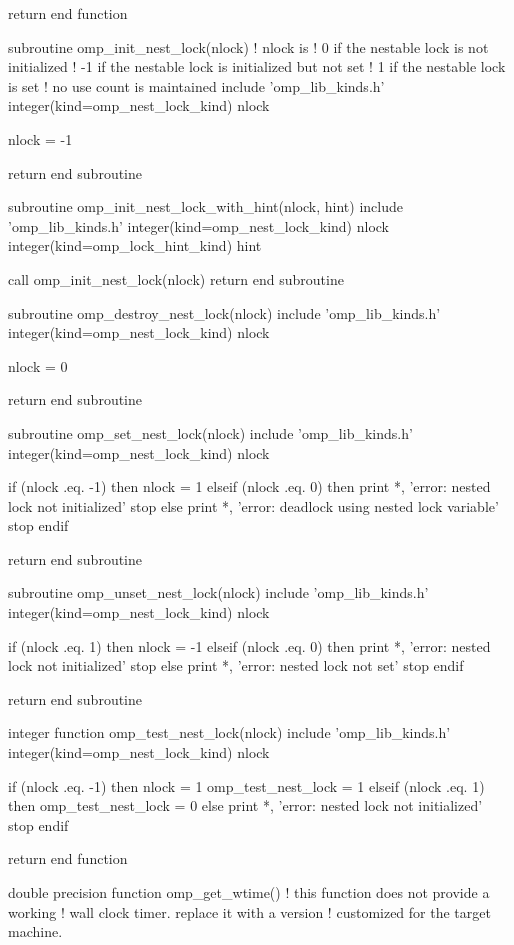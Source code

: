 {\begin{ompfFunction}
  return
end function

subroutine omp_init_nest_lock(nlock)
  ! nlock is
  ! 0 if the nestable lock is not initialized
  ! -1 if the nestable lock is initialized but not set
  ! 1 if the nestable lock is set
  ! no use count is maintained
  include 'omp_lib_kinds.h'
  integer(kind=omp_nest_lock_kind) nlock

  nlock = -1

  return
end subroutine

subroutine omp_init_nest_lock_with_hint(nlock, hint)
  include 'omp_lib_kinds.h'
  integer(kind=omp_nest_lock_kind) nlock
  integer(kind=omp_lock_hint_kind) hint

  call omp_init_nest_lock(nlock)
  return
end subroutine

subroutine omp_destroy_nest_lock(nlock)
  include 'omp_lib_kinds.h'
  integer(kind=omp_nest_lock_kind) nlock

  nlock = 0

  return
end subroutine

subroutine omp_set_nest_lock(nlock)
  include 'omp_lib_kinds.h'
  integer(kind=omp_nest_lock_kind) nlock

  if (nlock .eq. -1) then
    nlock = 1
  elseif (nlock .eq. 0) then
    print *, 'error: nested lock not initialized'
    stop
  else
    print *, 'error: deadlock using nested lock variable'
    stop
  endif

  return
end subroutine

subroutine omp_unset_nest_lock(nlock)
  include 'omp_lib_kinds.h'
  integer(kind=omp_nest_lock_kind) nlock

  if (nlock .eq. 1) then
    nlock = -1
  elseif (nlock .eq. 0) then
    print *, 'error: nested lock not initialized'
    stop
  else
    print *, 'error: nested lock not set'
    stop
  endif

  return
end subroutine

integer function omp_test_nest_lock(nlock)
  include 'omp_lib_kinds.h'
  integer(kind=omp_nest_lock_kind) nlock

  if (nlock .eq. -1) then
    nlock = 1
    omp_test_nest_lock = 1
  elseif (nlock .eq. 1) then
    omp_test_nest_lock = 0
  else
    print *, 'error: nested lock not initialized'
    stop
  endif

  return
end function

double precision function omp_get_wtime()
  ! this function does not provide a working
  ! wall clock timer. replace it with a version
  ! customized for the target machine.


\end{ompfFunction}}
